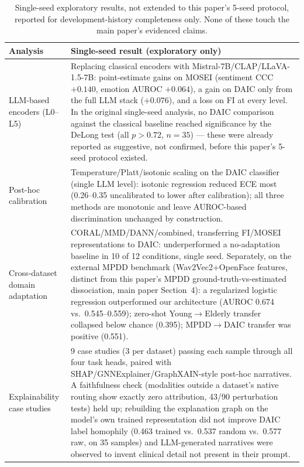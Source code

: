 \documentclass[letterpaper]{article}
\begin{document}
\begin{table}[t]
\centering
\caption{Single-seed exploratory results, not extended to this paper's 5-seed protocol, reported for development-history completeness only. None of these touch the main paper's evidenced claims.}
\label{tab:exploratory_summary}
\small
\begin{tabular}{p{}p{}}
\toprule
Analysis & Single-seed result (exploratory only) \\
\midrule
LLM-based encoders (L0--L5) & Replacing classical encoders with Mistral-7B/CLAP/LLaVA-1.5-7B: point-estimate gains on MOSEI (sentiment CCC $+0.140$, emotion AUROC $+0.064$), a gain on DAIC only from the full LLM stack ($+0.076$), and a loss on FI at every level. In the original single-seed analysis, no DAIC comparison against the classical baseline reached significance by the DeLong test (all $p>0.72$, $n{=}35$) — these were already reported as suggestive, not confirmed, before this paper's 5-seed protocol existed. \\
Post-hoc calibration & Temperature/Platt/isotonic scaling on the DAIC classifier (single LLM level): isotonic regression reduced ECE most (0.26--0.35 uncalibrated to lower after calibration); all three methods are monotonic and leave AUROC-based discrimination unchanged by construction. \\
Cross-dataset domain adaptation & CORAL/MMD/DANN/combined, transferring FI/MOSEI representations to DAIC: underperformed a no-adaptation baseline in 10 of 12 conditions, single seed. Separately, on the external MPDD benchmark (Wav2Vec2+OpenFace features, distinct from this paper's MPDD ground-truth-vs-estimated dissociation, main paper Section~4): a regularized logistic regression outperformed our architecture (AUROC 0.674 vs.\ 0.545--0.559); zero-shot Young$\to$Elderly transfer collapsed below chance (0.395); MPDD$\to$DAIC transfer was positive (0.551). \\
Explainability case studies & 9 case studies (3 per dataset) passing each sample through all four task heads, paired with SHAP/GNNExplainer/GraphXAIN-style post-hoc narratives. A faithfulness check (modalities outside a dataset's native routing show exactly zero attribution, 43/90 perturbation tests) held up; rebuilding the explanation graph on the model's own trained representation did not improve DAIC label homophily (0.463 trained vs.\ 0.537 random vs.\ 0.577 raw, on 35 samples) and LLM-generated narratives were observed to invent clinical detail not present in their prompt. \\
\bottomrule
\end{tabular}
\end{table}
\end{document}
